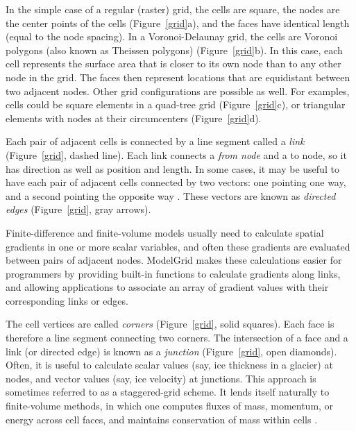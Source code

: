 \documentclass[12pt]{article}
\begin{document}
In the simple case of a regular (raster) grid, the cells are square, the nodes are the center points of the cells (Figure~\ref{grid}a), and the faces have identical length (equal to the node spacing). In a Voronoi-Delaunay grid, the cells are Voronoi polygons (also known as Theissen polygons) (Figure~\ref{grid}b). In this case, each cell represents the surface area that is closer to its own node than to any other node in the grid. The faces then represent locations that are equidistant between two adjacent nodes. Other grid configurations are possible as well. For examples, cells could be square elements in a quad-tree grid (Figure~\ref{grid}c), or triangular elements with nodes at their circumcenters (Figure~\ref{grid}d).

Each pair of adjacent cells is connected by a line segment called a {\em link} (Figure~\ref{grid}, dashed line). Each link connects a {\em from node} and a {to node}, so it has direction as well as position and length. In some cases, it may be useful to have each pair of adjacent cells connected by two vectors: one pointing one way, and a second pointing the opposite way \citep{guibas1985primitives,tucker2001object}. These vectors are known as {\em directed edges} (Figure~\ref{grid}, gray arrows). 

Finite-difference and finite-volume models usually need to calculate spatial gradients in one or more scalar variables, and often these gradients are evaluated between pairs of adjacent nodes. ModelGrid makes these calculations easier for programmers by providing built-in functions to calculate gradients along links, and allowing applications to associate an array of gradient values with their corresponding links or edges.

The cell vertices are called {\em corners} (Figure~\ref{grid}, solid squares). Each face is therefore a line segment connecting two corners. The intersection of a face and a link (or directed edge) is known as a {\em junction} (Figure~\ref{grid}, open diamonds). Often, it is useful to calculate scalar values (say, ice thickness in a glacier) at nodes, and vector values (say, ice velocity) at junctions. This approach is sometimes referred to as a staggered-grid scheme. It lends itself naturally to finite-volume methods, in which one computes fluxes of mass, momentum, or energy across cell faces, and maintains conservation of mass within cells \citep[e.g.,][]{versteeg2007introduction}.
\end{document}
